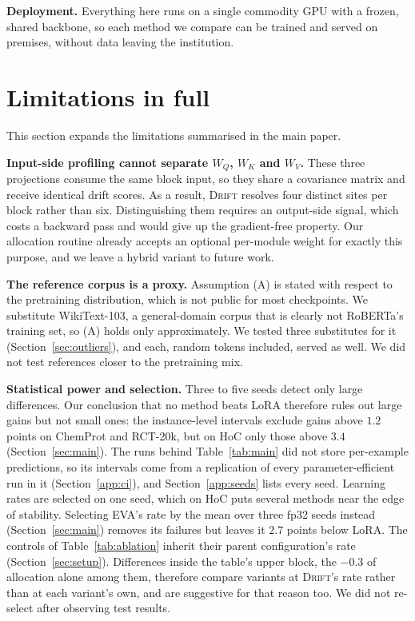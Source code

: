 \documentclass[conference,onecolumn]{IEEEtran}
\newcommand{\method}{\textsc{Drift}}
\begin{document}
\noindent\textbf{Deployment.} Everything here runs on a single commodity GPU
with a frozen, shared backbone, so each method we compare can be trained and
served on premises, without data leaving the institution.

\section{Limitations in full}
\label{sup:limits}
This section expands the limitations summarised in the main paper.

\noindent\textbf{Input-side profiling cannot separate $W_Q$, $W_K$ and $W_V$.}
These three projections consume the same block input, so they share a
covariance matrix and receive identical drift scores. As a result, \method{}
resolves four distinct sites per block rather than six. Distinguishing them
requires an output-side signal, which costs a backward pass and would give up
the gradient-free property. Our allocation routine already accepts an optional
per-module weight for exactly this purpose, and we leave a hybrid variant to
future work.

\noindent\textbf{The reference corpus is a proxy.}
Assumption (A) is stated with respect to the pretraining distribution, which is
not public for most checkpoints. We substitute WikiText-103, a general-domain
corpus that is clearly not RoBERTa's training set, so (A) holds only
approximately. We tested three substitutes for it (Section~\ref{sec:outliers}),
and each, random tokens included, served as well.
We did not test references closer to the pretraining mix.

\noindent\textbf{Statistical power and selection.}
Three to five seeds detect only large differences. Our conclusion that no
method beats LoRA therefore rules out large gains but not small ones: the
instance-level intervals exclude gains above $1.2$ points on ChemProt and
RCT-20k, but on HoC only those above $3.4$ (Section~\ref{sec:main}). The runs behind
Table~\ref{tab:main} did not store per-example predictions, so its intervals
come from a replication of every parameter-efficient run in it
(Section~\ref{app:ci}), and Section~\ref{app:seeds} lists every seed. Learning
rates are selected on one seed, which on HoC puts several methods near the edge
of stability. Selecting EVA's rate by the mean over three fp32 seeds instead
(Section~\ref{sec:main}) removes its failures but leaves it $2.7$ points below
LoRA. The controls of Table~\ref{tab:ablation} inherit their parent
configuration's rate (Section~\ref{sec:setup}). Differences inside the table's
upper block, the $-0.3$ of allocation alone among them, therefore
compare variants at \method{}'s rate rather than at each variant's own, and are
suggestive for that reason too. We did not re-select after observing test
results.
\end{document}
